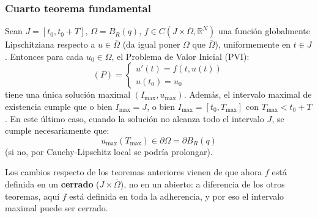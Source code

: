 \subsubsection{Cuarto teorema fundamental}

\begin{teorema}
    Sean $J = [t_0, t_0 + T]$, $\Omega = B_R(q)$, $f \in C(J \times \overline{\Omega}, \mathbb{R}^N)$ una función globalmente Lipschitziana respecto a $u \in \overline{\Omega}$ (da igual poner $\Omega$ que $\overline{\Omega}$), uniformemente en $t \in J$. Entonces para cada $u_0 \in \Omega$, el Problema de Valor Inicial (PVI):
    \[
        (P) =
        \begin{cases}
            u'(t) = f(t, u(t)) \\
            u(t_0) = u_0
        \end{cases}
    \]
    tiene una única solución maximal $(I_{\text{max}}, u_{\text{max}})$. Además, el intervalo maximal de existencia cumple que o bien $I_{\text{max}} = J$, o bien $I_{\text{max}} = [t_0, T_{\text{max}}]$ con $T_{\text{max}} < t_0 + T$. En este último caso, cuando la solución no alcanza todo el intervalo $J$, se cumple necesariamente que:
    \[
        u_{\text{max}}(T_{\text{max}}) \in \partial \Omega = \partial B_R(q)
    \]
    (si no, por Cauchy-Lipschitz local se podría prolongar).
\end{teorema}

Los cambios respecto de los teoremas anteriores vienen de que ahora $f$ está definida en un \textbf{cerrado} ($J \times \overline{\Omega}$), no en un abierto: a diferencia de los otros teoremas, aquí $f$ está definida en toda la adherencia, y por eso el intervalo maximal puede ser cerrado.

